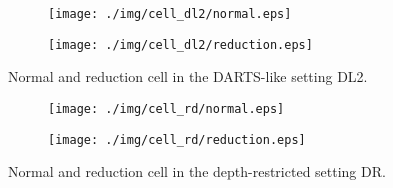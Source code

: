 \documentclass[conference]{IEEEtran}
\begin{document}
\begin{figure*}[htbp]
	
	\iffalse
		\begin{subfigure}{\textwidth}
			\begin{subfigure}{.48\textwidth}
				\texttt{[image: ./img/cell\_dl/normal.eps]}
			\end{subfigure}
			\hfill
			\begin{subfigure}{.48\textwidth}
				\texttt{[image: ./img/cell\_dl/reduction.eps]}
			\end{subfigure}
			\caption{Normal and reduction cell in the DARTS-like setting DL1.}
			\label{fig_cells_dl}
		\end{subfigure}
	\fi
	
	\begin{subfigure}{\textwidth}
		\begin{subfigure}{.48\textwidth}
			\texttt{[image: ./img/cell\_dl2/normal.eps]}
		\end{subfigure}
		\hfill
		\begin{subfigure}{.48\textwidth}
			\texttt{[image: ./img/cell\_dl2/reduction.eps]}
		\end{subfigure}
		\caption{Normal and reduction cell in the DARTS-like setting DL2.}
		\label{fig_cells_dl2}
	\end{subfigure}
	
	\begin{subfigure}{\textwidth}
		\begin{subfigure}{.48\textwidth}
			\texttt{[image: ./img/cell\_rd/normal.eps]}
		\end{subfigure}
		\hfill
		\begin{subfigure}{.48\textwidth}
			\texttt{[image: ./img/cell\_rd/reduction.eps]}
		\end{subfigure}%
		\caption{Normal and reduction cell in the depth-restricted setting DR.}
		\label{fig_cells_rd}
	\end{subfigure}
	
	\iffalse
		\begin{subfigure}{\textwidth}
			\begin{subfigure}{.48\textwidth}
				\texttt{[image: ./img/cell\_u/normal.eps]}
			\end{subfigure}
			\hfill
			\begin{subfigure}{.48\textwidth}
				\texttt{[image: ./img/cell\_u/reduction.eps]}
			\end{subfigure}
			\caption{Normal and reduction cell in the unrestricted setting UR.}
			\label{fig_cells_u}
		\end{subfigure}
	\fi
	

\end{figure*}
\end{document}
